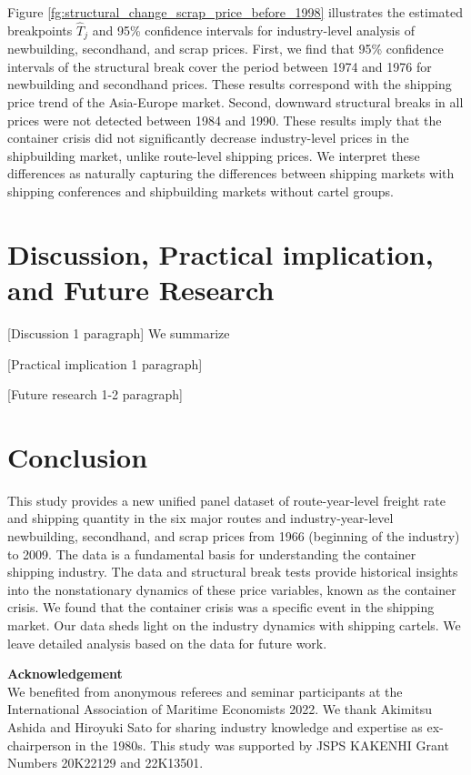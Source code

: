 \documentclass[11pt]{article}
\begin{document}
Figure \ref{fg:structural_change_scrap_price_before_1998} illustrates the estimated breakpoints $\hat{T}_j$ and 95\% confidence intervals for industry-level analysis of newbuilding, secondhand, and scrap prices. First, we find that 95\% confidence intervals of the structural break cover the period between 1974 and 1976 for newbuilding and secondhand prices. These results correspond with the shipping price trend of the Asia-Europe market. Second, downward structural breaks in all prices were not detected between 1984 and 1990. These results imply that the container crisis did not significantly decrease industry-level prices in the shipbuilding market, unlike route-level shipping prices. We interpret these differences as naturally capturing the differences between shipping markets with shipping conferences and shipbuilding markets without cartel groups.

\section{Discussion, Practical implication, and Future Research}

[Discussion 1 paragraph] We summarize 

[Practical implication 1 paragraph]

[Future research 1-2 paragraph]


\section{Conclusion}\label{sec:conclusion}
This study provides a new unified panel dataset of route-year-level freight rate and shipping quantity in the six major routes and industry-year-level newbuilding, secondhand, and scrap prices from 1966 (beginning of the industry) to 2009. The data is a fundamental basis for understanding the container shipping industry. The data and structural break tests provide historical insights into the nonstationary dynamics of these price variables, known as the container crisis. We found that the container crisis was a specific event in the shipping market. Our data sheds light on the industry dynamics with shipping cartels. We leave detailed analysis based on the data for future work. 

\textbf{Acknowledgement} \\
We benefited from anonymous referees and seminar participants at the International Association of Maritime Economists 2022. We thank Akimitsu Ashida and Hiroyuki Sato for sharing industry knowledge and expertise as ex-chairperson in the 1980s. This study was supported by JSPS KAKENHI Grant Numbers 20K22129 and 22K13501. 





\appendix

% 
% 
\end{document}
